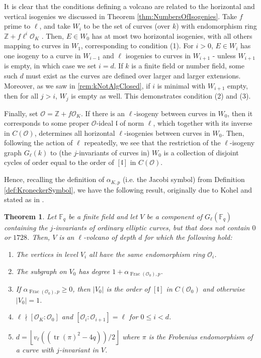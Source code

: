 \documentclass{amsart}
\newtheorem{thm}{Theorem}[section]
\theoremstyle{definition}
\theoremstyle{remark}
\numberwithin{equation}{section}
\newcommand{\cO}{\mathcal O}
\newcommand{\fkl}{\mathfrak l}
\newcommand{\bbF}{\mathbb F}
\newcommand{\bbZ}{\mathbb Z}
\DeclareMathOperator{\Frac}{Frac}
\DeclareMathOperator{\tr}{tr}
\begin{document}
 It is clear that the conditions defining a volcano are related to the horizontal and vertical isogenies we discussed in Theorem \ref{thm:NumbersOfIsogenies}. Take $f$ prime to $\ell$, and take $W_{i}$ to be the set of curves (over $k$) with endomorphism ring $\bbZ + f \ell^{i} \cO_{K}$ . Then, $E \in W_{0}$ has at most two horizontal isogenies, with all others mapping to curves in $W_{1}$, corresponding to condition (1). For $i > 0$, $E \in W_{i}$ has one isogeny to a curve in $W_{i-1}$ and $\ell$ isogenies to curves in $W_{i+1}$ - unless $W_{i+1}$ is empty, in which case we set $i = d$. If $k$ is a finite field or number field, some such $d$ must exist as the curves are defined over larger and larger extensions. Moreover, as we saw in \ref{rem:kNotAlgClosed}, if $i$ is minimal with $W_{i+1}$ empty, then for all $j > i$, $W_{j}$ is empty as well. This demonstrates condition (2) and (3).
 
 Finally, set $\cO = \bbZ + f\cO_{K}$. If there is an $\ell$-isogeny between curves in $W_{0}$, then it corresponds to some proper $\cO$-ideal $\fkl$ of norm $\ell$, which together with its inverse in $C(\cO)$, determines all horizontal $\ell$-isogenies between curves in $W_{0}$. Then, following the action of $\ell$ repeatedly, we see that the restriction of the $\ell$-isogeny graph $G_{\ell}(k)$ to (the $j$-invariants of curves in) $W_{0}$ is a collection of disjoint cycles of order equal to the order of $[\fkl]$ in $C(\cO)$.
 
 Hence, recalling the definition of $\alpha_{K,p}$ (i.e. the Jacobi symbol) from Definition \ref{def:KroneckerSymbol}, we have the following result, originally due to Kohel \cite{KohelThesis} and stated as in \cite{SutherlandIV}.
 
 \begin{thm} \label{thm:IsogenyVolcano}
 Let $\bbF_{q}$ be a finite field and let $V$ be a component of $G_{\ell}(\bbF_{q})$ containing the $j$-invariants of ordinary elliptic curves, but that does not contain $0$ or $1728$. Then, $V$ is an $\ell$-volcano of depth $d$ for which the following hold:
 \begin{enumerate}
 \item The vertices in level $V_{i}$ all have the same endomorphism ring $\cO_{i}$.
 \item The subgraph on $V_{0}$ has degree $1 + \alpha_{\Frac(\cO_{0}),p}$.
 \item If $\alpha_{\Frac(\cO_{0}),p} \geq 0$, then $|V_{0}|$ is the order of $[\fkl]$ in $C(\cO_{0})$ and otherwise $|V_{0}| = 1$.
 \item $\ell \nmid [\cO_{K}: \cO_{0}]$ and $[\cO_{i}: \cO_{i+1}] = \ell$ for $0 \leq i < d$.
 \item $d = \left\lfloor v_{\ell}((\tr(\pi)^2 - 4q))/2 \right\rfloor$ where $\pi$ is the Frobenius endomorphism of a curve with $j$-invariant in $V$.
 \end{enumerate}
 \end{thm}
  
\end{document}
